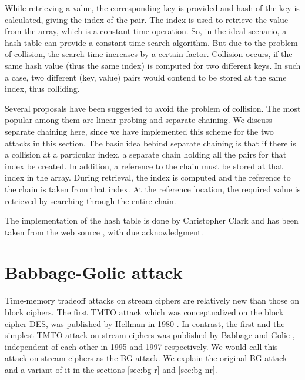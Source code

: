 While retrieving a value, the corresponding key is provided and hash of the key is calculated, giving the index of the pair. The index is used to retrieve the value from the array, which is a constant time operation. So, in the ideal scenario, a hash table can provide a constant time search algorithm. But due to the problem of collision, the search time increases by a certain factor. Collision occurs, if the same hash value (thus the same index) is computed for two different keys. In such a case, two different (key, value) pairs would contend to be stored at the same index, thus colliding.

Several proposals have been suggested to avoid the problem of collision. The most popular among them are linear probing and separate chaining. We discuss separate chaining here, since we have implemented this scheme for the two attacks in this section. The basic idea behind separate chaining is that if there is a collision at a particular index, a separate chain holding all the pairs for that index be created. In addition, a reference to the chain must be stored at that index in the array. During retrieval, the index is computed and the reference to the chain is taken from that index. At the reference location, the required value is retrieved by searching through the entire chain. 

The implementation of the hash table is done by Christopher Clark and has been taken from the web source \cite{hash-table-impl}, with due acknowledgment. 



\section{Babbage-Golic attack}
\label{sec:bg-attack}
Time-memory tradeoff attacks on stream ciphers are relatively new than those on block ciphers. The first TMTO attack which was conceptualized on the block cipher DES, was published by Hellman in 1980 \cite{hellman1980ctm}. In contrast, the first and the simplest TMTO attack on stream ciphers was published by Babbage \cite{babbage} and Golic \cite{golic}, independent of each other in 1995 and 1997 respectively. We would call this attack on stream ciphers as the BG attack. We explain the original BG attack and a variant of it in the sections \ref{sec:bg-r} and \ref{sec:bg-nr}.

